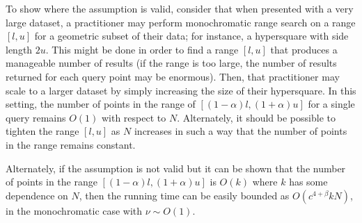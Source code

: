 To show where the assumption is valid, consider that when presented with a very
large dataset, a practitioner may perform monochromatic range search on a range
$[l, u]$ for a geometric subset of their data; for instance, a hypersquare
with side length $2u$.  This might be done in order to find a range $[l, u]$
that produces a manageable number of results (if the range is too large, the
number of results returned for each query point may be enormous).  Then, that
practitioner may scale to a larger dataset by simply increasing the size of
their hypersquare.  In this setting, the number of points in the range of
$[(1 - \alpha)l, (1 + \alpha)u]$ for a single query remains $O(1)$ with respect
to $N$.  Alternately, it should be possible to tighten the range $[l, u]$ as $N$
increases in such a way that the number of points in the range remains constant.


Alternately, if the assumption is not valid but it can be shown that the number
of points in the range $[(1 - \alpha)l, (1 + \alpha)u]$ is $O(k)$ where $k$ has
some dependence on $N$, then the running time can be easily bounded as $O(c^{4 +
\beta} kN)$, in the monochromatic case with $\nu \sim O(1)$.


